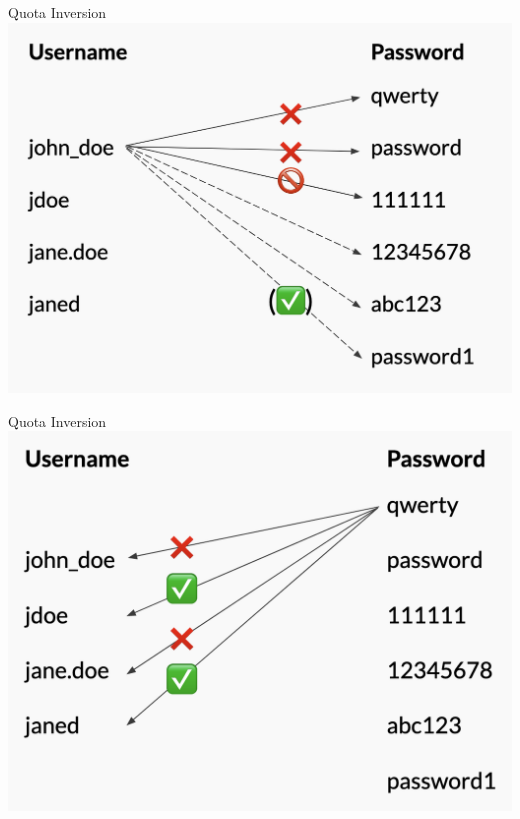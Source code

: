 \documentclass[nobackground,dvipsnames,table,aspectratio=169]{beamer}
\begin{document}
\begin{frame}{Quota Inversion}
    \centering
    \includegraphics[height=0.85\textheight]{quota-inversion-1}
\end{frame}

\begin{frame}{Quota Inversion}
    \centering
    \includegraphics[height=0.85\textheight]{quota-inversion-2}
\end{frame}
\end{document}
